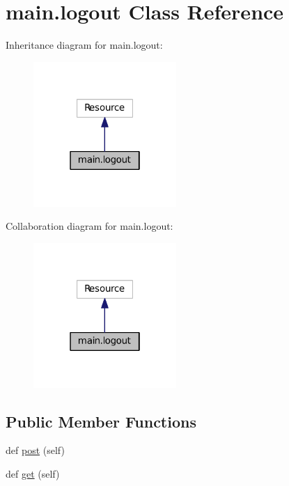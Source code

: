 \hypertarget{classmain_1_1logout}{}\section{main.\+logout Class Reference}
\label{classmain_1_1logout}


Inheritance diagram for main.\+logout\+:
\nopagebreak
\begin{figure}[H]
\begin{center}
\leavevmode
\includegraphics[width=154pt]{classmain_1_1logout__inherit__graph}
\end{center}
\end{figure}


Collaboration diagram for main.\+logout\+:
\nopagebreak
\begin{figure}[H]
\begin{center}
\leavevmode
\includegraphics[width=154pt]{classmain_1_1logout__coll__graph}
\end{center}
\end{figure}
\subsection*{Public Member Functions}
\begin{DoxyCompactItemize}
\item 
def \hyperlink{classmain_1_1logout_a726ef779e6bf4da8974eae3209276922}{post} (self)
\item 
def \hyperlink{classmain_1_1logout_a014267caa3d9cc9e42fdb71ef54ce43b}{get} (self)
\end{DoxyCompactItemize}


